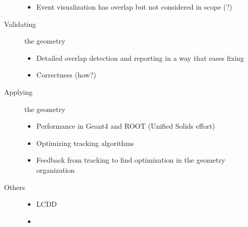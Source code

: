 \begin{description}
\begin{itemize}
  \item Event visualization has overlap but not considered in scope (?)
  \end{itemize}
\item[Validating] the geometry
  \begin{itemize}
  \item Detailed overlap detection and reporting in a way that eases fixing
  \item Correctness (how?)
  \end{itemize}
\item[Applying] the geometry 
  \begin{itemize}
  \item Performance in Geant4 and ROOT (Unified Solids effort)
  \item Optimizing tracking algorithms
  \item Feedback from tracking to find optimization in the geometry organization 
  \end{itemize}
\item[Others] 
  \begin{itemize}
  \item LCDD
  \item 
  \end{itemize}
\end{description}

